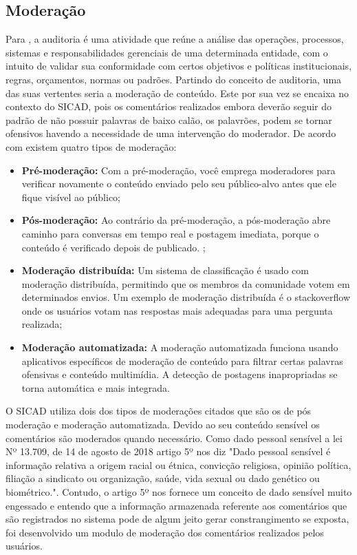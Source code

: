 \documentclass[12pt, a4paper]{report}
\begin{document}
\subsection{Moderação}
\label{subsec:moderacao}
Para \citep{netosolanca2007}, a auditoria é uma atividade que reúne a análise das operações, processos, sistemas e responsabilidades gerenciais de uma determinada entidade, com o intuito de validar sua conformidade com certos objetivos e políticas institucionais, regras, orçamentos, normas ou padrões.
Partindo do conceito de auditoria, uma das suas vertentes seria a moderação de conteúdo. Este por sua vez se encaixa no contexto do SICAD, pois os comentários realizados embora deverão seguir do padrão de não possuir palavras de baixo calão, os palavrões, podem se tornar ofensivos havendo a necessidade de uma intervenção do moderador.
De acordo com \cite{SMITH2019} existem quatro tipos de moderação:
\begin{itemize}
\item \textbf {Pré-moderação: }Com a pré-moderação, você emprega moderadores para verificar novamente o conteúdo enviado pelo seu público-alvo antes que ele fique visível ao público; 
\item \textbf {Pós-moderação: }Ao contrário da pré-moderação, a pós-moderação abre caminho para conversas em tempo real e postagem imediata, porque o conteúdo é verificado depois de publicado. ;
\item \textbf {Moderação distribuída: }Um sistema de classificação é usado com moderação distribuída, permitindo que os membros da comunidade votem em determinados envios. Um exemplo de moderação distribuída é o stackoverflow onde os usuários votam nas respostas mais adequadas para uma pergunta realizada;
\item \textbf {Moderação automatizada: }A moderação automatizada funciona usando aplicativos específicos de moderação de conteúdo para filtrar certas palavras ofensivas e conteúdo multimídia. A detecção de postagens inapropriadas se torna automática e mais integrada. 
\end{itemize}

O SICAD utiliza dois dos tipos de moderações citados que são os de pós moderação e moderação automatizada. Devido ao seu conteúdo sensível os comentários são moderados quando necessário. Como dado pessoal sensível a lei Nº 13.709, de 14 de agosto de 2018 artigo 5º nos diz "Dado pessoal sensível é informação relativa a origem racial ou étnica, convicção religiosa, opinião política, filiação a sindicato ou organização, saúde, vida sexual ou dado genético ou biométrico.".  Contudo, o artigo 5º nos fornece um conceito de dado sensível muito engessado e entendo que a informação armazenada referente aos comentários que são registrados no sistema pode de algum jeito gerar constrangimento se exposta, foi desenvolvido um modulo de moderação dos comentários realizados pelos usuários.
\end{document}
